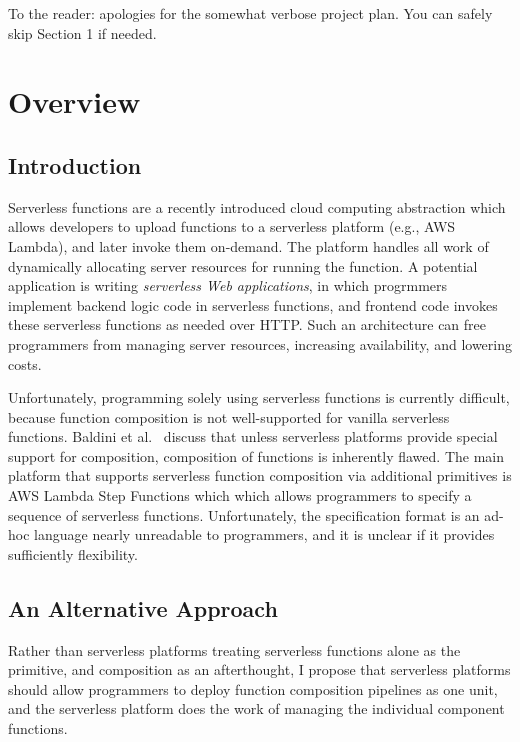 \documentclass[12pt]{article}
\begin{document}
\maketitle

To the reader: apologies for the somewhat verbose
project plan. You can safely skip Section 1 if needed.

\section{Overview}

\subsection{Introduction}

Serverless functions are a recently introduced cloud
computing abstraction which allows developers to
upload functions to a serverless platform (e.g., AWS Lambda),
and later invoke them on-demand.
The platform handles all work of dynamically allocating server resources 
for running the function. A potential application is writing 
\emph{serverless Web applications}, in which progrmmers implement
backend logic code in serverless functions, and frontend code invokes these
serverless functions as needed over HTTP. Such an architecture can free
programmers from managing server resources, increasing availability, and lowering
costs.

Unfortunately, programming solely using serverless 
functions is currently difficult, because function 
composition is not well-supported for vanilla serverless functions.
Baldini et al.~\cite{baldini:trilemma} discuss that unless
serverless platforms provide special support for composition,
composition of functions is inherently flawed. 
The main platform that supports serverless function composition
via additional primitives is AWS Lambda Step Functions which
which allows programmers to specify a sequence of 
serverless functions. Unfortunately, the specification format is
an ad-hoc language nearly unreadable to programmers, 
and it is unclear if it provides sufficiently flexibility.

\subsection{An Alternative Approach}

Rather than serverless platforms treating serverless functions
alone as the primitive, and composition as an
afterthought, I propose that serverless platforms
should allow programmers to deploy function composition pipelines
as one unit, and the serverless platform does 
the work of managing the individual component functions.
\end{document}
